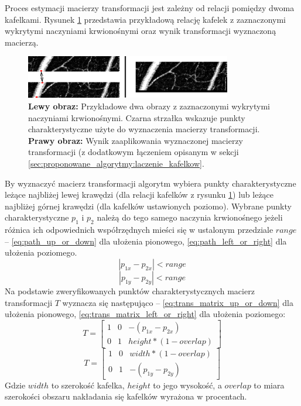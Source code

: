 Proces estymacji macierzy transformacji jest zależny od relacji pomiędzy dwoma kafelkami. Rysunek \ref{fig:proponowane_algorytmy:path_trans} przedstawia przykładową relację kafelek z zaznaczonymi wykrytymi naczyniami krwionośnymi oraz wynik transformacji wyznaczoną macierzą.

\begin{figure}[H]
  \centering
  \includegraphics[width=9cm]{gfx/path_trans}
  \caption{\textbf{Lewy obraz:} Przykładowe dwa obrazy z zaznaczonymi wykrytymi naczyniami krwionośnymi. Czarna strzałka wskazuje punkty charakterystyczne użyte do wyznaczenia macierzy transformacji. \textbf{Prawy obraz:} Wynik zaaplikowania wyznaczonej macierzy transformacji (z dodatkowym łączeniem opisanym w sekcji \ref{sec:proponowane_algorytmy:laczenie_kafelkow}.}
  \label{fig:proponowane_algorytmy:path_trans}
\end{figure}

By wyznaczyć macierz transformacji algorytm wybiera punkty charakterystyczne leżące najbliżej lewej krawędzi (dla relacji kafelków z rysunku \ref{fig:proponowane_algorytmy:path_trans}) lub leżące najbliżej górnej krawędzi (dla kafelków ustawionych poziomo). Wybrane punkty charakterystyczne $p_{1}$ i $p_{2}$ należą do tego samego naczynia krwionośnego jeżeli różnica ich odpowiednich współrzędnych mieści się w ustalonym przedziale $range$ -- \ref{eq:path_up_or_down} dla ułożenia pionowego, \ref{eq:path_left_or_right} dla ułożenia poziomego.
\begin{equation}
\left|p_{1x}- p_{2x}\right| < range
\label{eq:path_up_or_down}
\end{equation}
\begin{equation}
\left|p_{1y} - p_{2y}\right| < range
\label{eq:path_left_or_right}
\end{equation}
Na podstawie zweryfikowanych punktów charakterystycznych macierz transformacji $T$ wyznacza się następująco -- \ref{eq:trans_matrix_up_or_down} dla ułożenia pionowego, \ref{eq:trans_matrix_left_or_right} dla ułożenia poziomego:
\begin{equation}
T = \begin{bmatrix}
  1 & 0 & -(p_{1x} - p_{2x})\\
  0 & 1 & height * (1 - overlap)
\end{bmatrix}
\label{eq:trans_matrix_up_or_down}
\end{equation}
\begin{equation}
T = \begin{bmatrix}
  1 & 0 & width * (1 - overlap) \\
  0 & 1 & -(p_{1y} - p_{2y})
\end{bmatrix}
\label{eq:trans_matrix_left_or_right}
\end{equation}
Gdzie $width$ to szerokość kafelka, $height$ to jego wysokość, a $overlap$ to miara szerokości obszaru nakładania się kafelków wyrażona w procentach.

